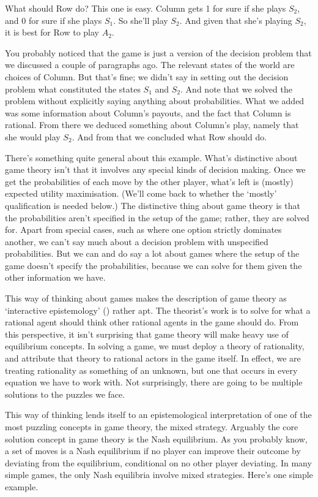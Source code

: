 \documentclass[
  10pt,
  letterpaper,
  DIV=11,
  numbers=noendperiod,
  twoside]{scrartcl}
\begin{document}
What should Row do? This one is easy. Column gets 1 for sure if she
plays \(S_2\), and 0 for sure if she plays \(S_1\). So she'll play
\(S_2\). And given that she's playing \(S_2\), it is best for Row to
play \(A_2\).

You probably noticed that the game is just a version of the decision
problem that we discussed a couple of paragraphs ago. The relevant
states of the world are choices of Column. But that's fine; we didn't
say in setting out the decision problem what constituted the states
\(S_1\) and \(S_2\). And note that we solved the problem without
explicitly saying anything about probabilities. What we added was some
information about Column's payouts, and the fact that Column is
rational. From there we deduced something about Column's play, namely
that she would play \(S_2\). And from that we concluded what Row should
do.

There's something quite general about this example. What's distinctive
about game theory isn't that it involves any special kinds of decision
making. Once we get the probabilities of each move by the other player,
what's left is (mostly) expected utility maximisation. (We'll come back
to whether the `mostly' qualification is needed below.) The distinctive
thing about game theory is that the probabilities aren't specified in
the setup of the game; rather, they are solved for. Apart from special
cases, such as where one option strictly dominates another, we can't say
much about a decision problem with unspecified probabilities. But we can
and do say a lot about games where the setup of the game doesn't specify
the probabilities, because we can solve for them given the other
information we have.

This way of thinking about games makes the description of game theory as
`interactive epistemology' ()
rather apt. The theorist's work is to solve for what a rational agent
should think other rational agents in the game should do. From this
perspective, it isn't surprising that game theory will make heavy use of
equilibrium concepts. In solving a game, we must deploy a theory of
rationality, and attribute that theory to rational actors in the game
itself. In effect, we are treating rationality as something of an
unknown, but one that occurs in every equation we have to work with. Not
surprisingly, there are going to be multiple solutions to the puzzles we
face.

This way of thinking lends itself to an epistemological interpretation
of one of the most puzzling concepts in game theory, the mixed strategy.
Arguably the core solution concept in game theory is the Nash
equilibrium. As you probably know, a set of moves is a Nash equilibrium
if no player can improve their outcome by deviating from the
equilibrium, conditional on no other player deviating. In many simple
games, the only Nash equilibria involve mixed strategies. Here's one
simple example.
\end{document}
